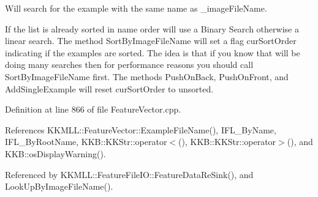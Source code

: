 Will search for the example with the same name as \textquotesingle{}\+\_\+image\+File\+Name\textquotesingle{}. 

If the list is already sorted in name order will use a Binary Search otherwise a linear search. The method \textquotesingle{}Sort\+By\+Image\+File\+Name\textquotesingle{} will set a flag \textquotesingle{}cur\+Sort\+Order\textquotesingle{} indicating if the examples are sorted. The idea is that if you know that will be doing many searches then for performance reasons you should call \textquotesingle{}Sort\+By\+Image\+File\+Name\textquotesingle{} first. The methods \textquotesingle{}Push\+On\+Back\textquotesingle{}, \textquotesingle{}Push\+On\+Front\textquotesingle{}, and \textquotesingle{}Add\+Single\+Example\textquotesingle{} will reset \textquotesingle{}cur\+Sort\+Order\textquotesingle{} to unsorted. 

Definition at line 866 of file Feature\+Vector.\+cpp.



References K\+K\+M\+L\+L\+::\+Feature\+Vector\+::\+Example\+File\+Name(), I\+F\+L\+\_\+\+By\+Name, I\+F\+L\+\_\+\+By\+Root\+Name, K\+K\+B\+::\+K\+K\+Str\+::operator$<$(), K\+K\+B\+::\+K\+K\+Str\+::operator$>$(), and K\+K\+B\+::os\+Display\+Warning().



Referenced by K\+K\+M\+L\+L\+::\+Feature\+File\+I\+O\+::\+Feature\+Data\+Re\+Sink(), and Look\+Up\+By\+Image\+File\+Name().


